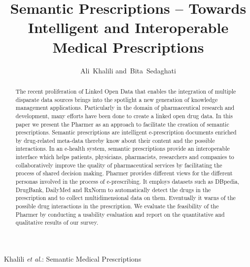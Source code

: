 \documentclass[journal]{IEEEtran}
\begin{document}
%
\title{Semantic Prescriptions -- Towards Intelligent and Interoperable Medical Prescriptions }

\author{Ali~Khalili
        and~Bita~Sedaghati
}


%
{Khalili \MakeLowercase{\textit{et al.}}: Semantic Medical Prescriptions}
%

\maketitle


\begin{abstract}
The recent proliferation of Linked Open Data that enables the integration of multiple disparate data sources brings into the spotlight a new generation of knowledge management applications.
Particularly in the domain of pharmaceutical research and development, many efforts have been done to create a linked open drug data.
In this paper we present the Pharmer as an approach to facilitate the creation of semantic prescriptions.
Semantic prescriptions are intelligent e-prescription documents enriched by drug-related meta-data thereby know about their content and the possible interactions.
In an e-health system, semantic prescriptions provide an interoperable interface which helps patients, physicians, pharmacists, researchers and companies to collaboratively improve the quality of pharmaceutical services by facilitating the process of shared decision making.
Pharmer provides different views for the different personas involved in the process of e-prescribing.
It employs datasets such as DBpedia, DrugBank, DailyMed and RxNorm to automatically detect the drugs in the prescription and to collect multidimensional data on them.
Eventually it warns of the possible drug interactions in the prescription.
We evaluate the feasibility of the Pharmer by conducting a usability evaluation and report on the quantitative and qualitative results of our survey.
\end{abstract}
\end{document}
